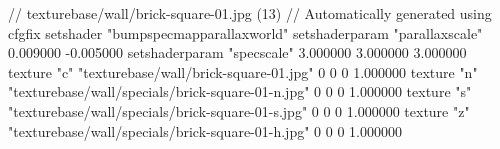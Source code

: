 // texturebase/wall/brick-square-01.jpg (13)
// Automatically generated using cfgfix
setshader "bumpspecmapparallaxworld"
setshaderparam "parallaxscale" 0.009000 -0.005000
setshaderparam "specscale" 3.000000 3.000000 3.000000
texture "c" "texturebase/wall/brick-square-01.jpg" 0 0 0 1.000000
texture "n" "texturebase/wall/specials/brick-square-01-n.jpg" 0 0 0 1.000000
texture "s" "texturebase/wall/specials/brick-square-01-s.jpg" 0 0 0 1.000000
texture "z" "texturebase/wall/specials/brick-square-01-h.jpg" 0 0 0 1.000000
